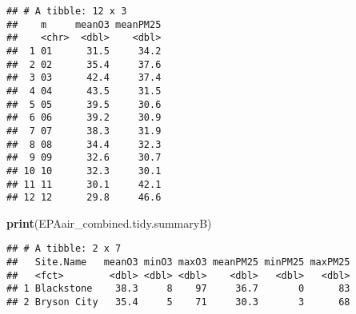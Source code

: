 \documentclass[]{article}
\newenvironment{Shaded}{\begin{snugshade}}{\end{snugshade}}
\newcommand{\KeywordTok}[1]{\textcolor[rgb]{0.13,0.29,0.53}{\textbf{#1}}}
\newcommand{\DataTypeTok}[1]{\textcolor[rgb]{0.13,0.29,0.53}{#1}}
\newcommand{\DecValTok}[1]{\textcolor[rgb]{0.00,0.00,0.81}{#1}}
\newcommand{\StringTok}[1]{\textcolor[rgb]{0.31,0.60,0.02}{#1}}
\newcommand{\CommentTok}[1]{\textcolor[rgb]{0.56,0.35,0.01}{\textit{#1}}}
\newcommand{\OperatorTok}[1]{\textcolor[rgb]{0.81,0.36,0.00}{\textbf{#1}}}
\newcommand{\NormalTok}[1]{#1}
\begin{document}
\begin{Shaded}
\end{Shaded}

\begin{verbatim}
## # A tibble: 12 x 3
##    m     meanO3 meanPM25
##    <chr>  <dbl>    <dbl>
##  1 01      31.5     34.2
##  2 02      35.4     37.6
##  3 03      42.4     37.4
##  4 04      43.5     31.5
##  5 05      39.5     30.6
##  6 06      39.2     30.9
##  7 07      38.3     31.9
##  8 08      34.4     32.3
##  9 09      32.6     30.7
## 10 10      32.3     30.1
## 11 11      30.1     42.1
## 12 12      29.8     46.6
\end{verbatim}

\begin{Shaded}
\begin{Highlighting}[]
\KeywordTok{print}\NormalTok{(EPAair_combined.tidy.summaryB)}
\end{Highlighting}
\end{Shaded}

\begin{verbatim}
## # A tibble: 2 x 7
##   Site.Name   meanO3 minO3 maxO3 meanPM25 minPM25 maxPM25
##   <fct>        <dbl> <dbl> <dbl>    <dbl>   <dbl>   <dbl>
## 1 Blackstone    38.3     8    97     36.7       0      83
## 2 Bryson City   35.4     5    71     30.3       3      68
\end{verbatim}
\end{document}
